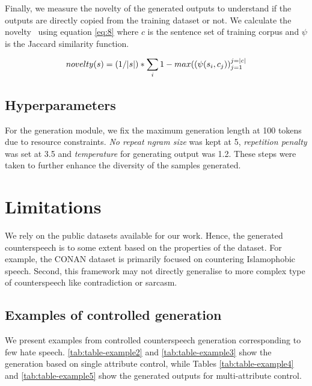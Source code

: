 Finally, we measure the novelty of the generated outputs to understand if the outputs are directly copied from the training dataset or not. We calculate the novelty~\cite{wang2018sentigan} using equation \ref{eq:8} where $c$ is the sentence set of training corpus and $\psi$ is the Jaccard similarity function. 

\begin{equation}
\footnotesize
    \label{eq:8}
    novelty(s) =(1/|s|)*\sum_{i}1-max((\psi(s_{i},c_{j}))_{j=1}^{j=|c|}
\end{equation}

\subsection{Hyperparameters}
For the generation module, we fix the maximum generation length at 100 tokens due to resource constraints. \textit{No repeat ngram size} was kept at 5, \textit{repetition penalty} was set at 3.5 and \textit{temperature} for generating output was 1.2. These steps were taken to further enhance the diversity of the samples generated.

\section{Limitations}

We rely on the public datasets available for our work. Hence, the generated counterspeech is to some extent based on the properties of the dataset. For example, the CONAN dataset is primarily focused on countering Islamophobic speech. Second, this framework may not directly generalise to more complex type of counterspeech like contradiction or sarcasm. 


\subsection{Examples of controlled generation}
We present examples from controlled counterspeech generation corresponding to few hate speech. \ref{tab:table-example2} and \ref{tab:table-example3} show the generation based on single attribute control, while Tables \ref{tab:table-example4} and \ref{tab:table-example5} show the generated outputs for multi-attribute control.




